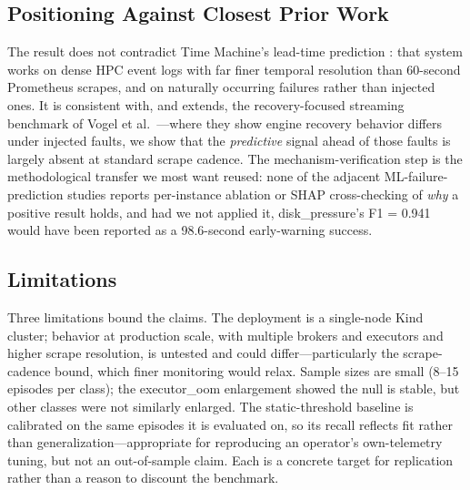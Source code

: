 \documentclass[conference]{IEEEtran}
\newcommand{\eo}{executor\_oom}
\newcommand{\dpr}{disk\_pressure}
\begin{document}
\subsection{Positioning Against Closest Prior Work}
The result does not contradict Time Machine's lead-time prediction \cite{alharthi2023}: that system works on dense HPC event logs with far finer temporal resolution than 60-second Prometheus scrapes, and on naturally occurring failures rather than injected ones. It is consistent with, and extends, the recovery-focused streaming benchmark of Vogel et al.\ \cite{vogel2024}---where they show engine recovery behavior differs under injected faults, we show that the \emph{predictive} signal ahead of those faults is largely absent at standard scrape cadence. The mechanism-verification step is the methodological transfer we most want reused: none of the adjacent ML-failure-prediction studies \cite{wu2021,lin2018,harrison2018} reports per-instance ablation or SHAP cross-checking of \emph{why} a positive result holds, and had we not applied it, \dpr{}'s F1 = 0.941 would have been reported as a 98.6-second early-warning success.

\subsection{Limitations}
Three limitations bound the claims. The deployment is a single-node Kind cluster; behavior at production scale, with multiple brokers and executors and higher scrape resolution, is untested and could differ---particularly the scrape-cadence bound, which finer monitoring would relax. Sample sizes are small (8--15 episodes per class); the \eo{} enlargement showed the null is stable, but other classes were not similarly enlarged. The static-threshold baseline is calibrated on the same episodes it is evaluated on, so its recall reflects fit rather than generalization---appropriate for reproducing an operator's own-telemetry tuning, but not an out-of-sample claim. Each is a concrete target for replication rather than a reason to discount the benchmark.
\end{document}
